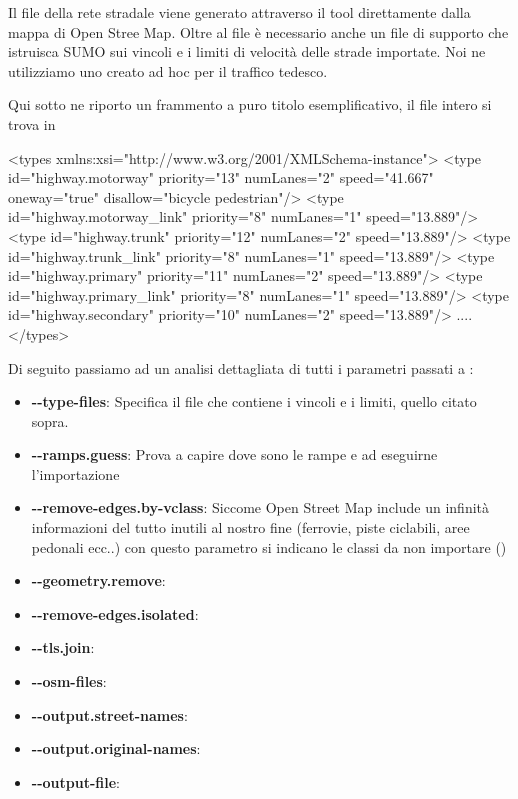 Il file della rete stradale viene generato attraverso il tool  direttamente dalla mappa di Open Stree Map. Oltre al file  è necessario anche un file di supporto che istruisca SUMO sui vincoli e i limiti di velocità delle strade importate. Noi ne utilizziamo uno creato ad hoc per il traffico tedesco. 

Qui sotto ne riporto un frammento a puro titolo esemplificativo, il file intero si trova in 

\begin{xml}
<types xmlns:xsi="http://www.w3.org/2001/XMLSchema-instance">
  <type id="highway.motorway" priority="13" numLanes="2" speed="41.667"
                oneway="true" disallow="bicycle pedestrian"/>
  <type id="highway.motorway_link" priority="8" numLanes="1" speed="13.889"/>
  <type id="highway.trunk" priority="12" numLanes="2" speed="13.889"/>
  <type id="highway.trunk_link" priority="8" numLanes="1" speed="13.889"/>
  <type id="highway.primary" priority="11" numLanes="2" speed="13.889"/>
  <type id="highway.primary_link" priority="8" numLanes="1" speed="13.889"/>
  <type id="highway.secondary" priority="10" numLanes="2" speed="13.889"/>
  ....
</types> 
\end{xml}

Di seguito passiamo ad un analisi dettagliata di tutti i parametri passati a :

\begin{itemize}
	\item \textbf{-{}-type-files}: Specifica il file che contiene i vincoli e i limiti, quello citato sopra.
	\item \textbf{-{}-ramps.guess}: Prova a capire dove sono le rampe e ad eseguirne l'importazione
	\item \textbf{-{}-remove-edges.by-vclass}: Siccome Open Street Map include un infinità informazioni del tutto inutili al nostro fine (ferrovie, piste ciclabili, aree pedonali ecc..) con questo parametro si indicano le classi da non importare ()
	\item \textbf{-{}-geometry.remove}:
	\item \textbf{-{}-remove-edges.isolated}:
	\item \textbf{-{}-tls.join}:
	\item \textbf{-{}-osm-files}:
	\item \textbf{-{}-output.street-names}:
	\item \textbf{-{}-output.original-names}:
	\item \textbf{-{}-output-file}:
\end{itemize}

